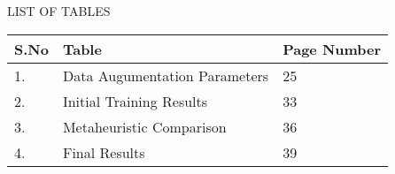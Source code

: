 \thispagestyle{plain}

\section*{}
\begin{center}
\large \large {LIST OF TABLES}
\end{center}


\begin{table}[H]
\begin{tabular}{|l|l|l|}
\hline
S.No & Table                         & Page Number \\ \hline
1.   & Data Augumentation Parameters & 25          \\ \hline
2.   & Initial Training Results      & 33         \\ \hline
3.   & Metaheuristic Comparison      & 36          \\ \hline
4.   & Final Results                 & 39          \\ \hline
\end{tabular}
\end{table}
